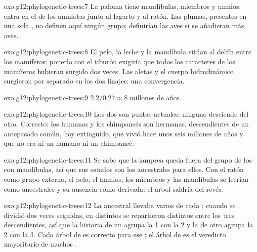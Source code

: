 \begin{solution}{exo:g12:phylogenetic-trees:7}
La paloma tiene mandíbulas, miembros y amnios: entra en el  de los
amniotas junto al lagarto y al ratón. Las plumas, presentes en una sola
, no definen aquí ningún grupo; definirían las aves si se
añadieran más aves.
\end{solution}

\begin{solution}{exo:g12:phylogenetic-trees:8}
El pelo, la leche y la mandíbula sitúan al delfín entre los mamíferos;
ponerlo con el tiburón exigiría que todos los caracteres de los
mamíferos hubieran surgido dos veces. Las aletas y el cuerpo
hidrodinámico surgieron por separado en los dos linajes: una
convergencia.
\end{solution}

\begin{solution}{exo:g12:phylogenetic-trees:9}
$2.2/0.27 \approx 8$ millones de años.
\end{solution}

\begin{solution}{exo:g12:phylogenetic-trees:10}
Los dos son puntas actuales; ninguno desciende del otro. Correcto: los
humanos y los chimpancés son  hermanas, descendientes de un
antepasado común, hoy extinguido, que vivió hace unos seis millones de
años y que no era ni un humano ni un chimpancé.
\end{solution}

\begin{solution}{exo:g12:phylogenetic-trees:11}
Se sabe que la lamprea queda fuera del grupo de los  con
mandíbulas, así que sus estados son los ancestrales para ellos. Con el
ratón como grupo externo, el pelo, el amnios, los miembros y las
mandíbulas se leerían como ancestrales y su ausencia como derivada: el
árbol saldría del revés.
\end{solution}

\begin{solution}{exo:g12:phylogenetic-trees:12}
La  ancestral llevaba varios  de cada ; cuando se
dividió dos veces seguidas, en distintos  se repartieron 
distintos entre los tres descendientes, así que la historia de un 
agrupa la  1 con la 2 y la de otro agrupa la 2 con la 3. Cada
árbol de  es correcto para ese ; el árbol de  es el
veredicto mayoritario de muchos .
\end{solution}

